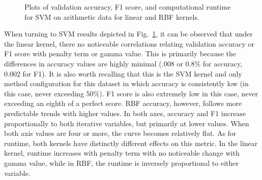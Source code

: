 \documentclass[12pt]{uthesis-v12}  %
\begin{document}
\begin{figure}
	\hfill	
{}
						
\caption{Plots of validation accuracy, F1 score, and computational runtime for SVM on arithmetic data for linear and RBF kernels.}
	\label{svm-nata}
	\end{figure}
	
When turning to SVM results depicted in Fig.~\ref{svm-nata}, it can be observed that under the linear kernel, there no noticeable correlations relating validation accuracy or F1 score with penalty term or gamma value. This is primarily because the differences in accuracy values are highly minimal (.008 or 0.8\% for accuracy, 0.002 for F1). It is also worth recalling that this is the SVM kernel and only method configuration for this dataset in which accuracy is consistently low (in this case, never exceeding 50\%). F1 score is also extremely low in this case, never exceeding an eighth of a perfect score. RBF accuracy, however, follows more predictable trends with higher values. In both axes, accuracy and F1 increase proportionally to both iterative variables, but primarily at lower values. When both axis values are four or more, the curve becomes relatively flat. As for runtime, both kernels have distinctly different effects on this metric. In the linear kernel, runtime increases with penalty term with no noticeable change with gamma value, while in RBF, the runtime is inversely proportional to either variable.
\end{document}
